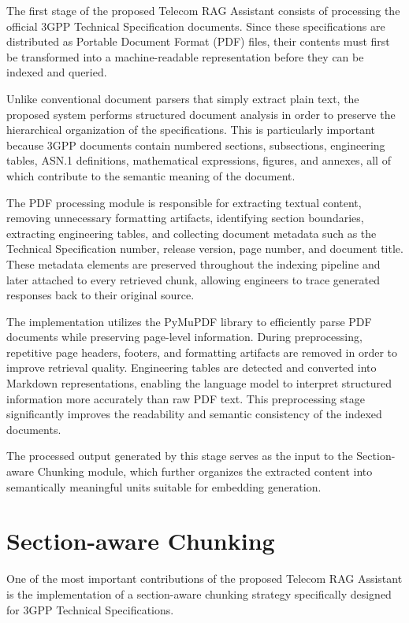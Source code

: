 The first stage of the proposed Telecom RAG Assistant consists of processing the official 3GPP Technical Specification documents. Since these specifications are distributed as Portable Document Format (PDF) files, their contents must first be transformed into a machine-readable representation before they can be indexed and queried.

Unlike conventional document parsers that simply extract plain text, the proposed system performs structured document analysis in order to preserve the hierarchical organization of the specifications. This is particularly important because 3GPP documents contain numbered sections, subsections, engineering tables, ASN.1 definitions, mathematical expressions, figures, and annexes, all of which contribute to the semantic meaning of the document.

The PDF processing module is responsible for extracting textual content, removing unnecessary formatting artifacts, identifying section boundaries, extracting engineering tables, and collecting document metadata such as the Technical Specification number, release version, page number, and document title. These metadata elements are preserved throughout the indexing pipeline and later attached to every retrieved chunk, allowing engineers to trace generated responses back to their original source.

The implementation utilizes the PyMuPDF library to efficiently parse PDF documents while preserving page-level information. During preprocessing, repetitive page headers, footers, and formatting artifacts are removed in order to improve retrieval quality. Engineering tables are detected and converted into Markdown representations, enabling the language model to interpret structured information more accurately than raw PDF text. This preprocessing stage significantly improves the readability and semantic consistency of the indexed documents.

The processed output generated by this stage serves as the input to the Section-aware Chunking module, which further organizes the extracted content into semantically meaningful units suitable for embedding generation.

\section{Section-aware Chunking}

One of the most important contributions of the proposed Telecom RAG Assistant is the implementation of a section-aware chunking strategy specifically designed for 3GPP Technical Specifications.

